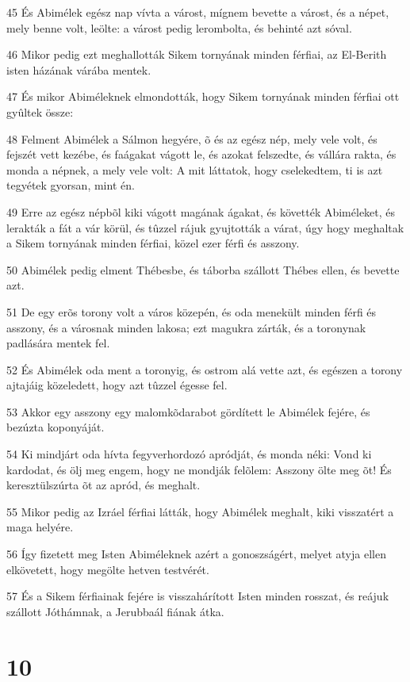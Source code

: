 \par 45 És Abimélek egész nap vívta a várost, mígnem bevette a várost, és a népet, mely benne volt, leölte: a várost pedig lerombolta, és behinté azt sóval.
\par 46 Mikor pedig ezt meghallották Sikem tornyának minden férfiai, az El-Berith isten házának várába mentek.
\par 47 És mikor Abiméleknek elmondották, hogy Sikem tornyának minden férfiai ott gyûltek össze:
\par 48 Felment Abimélek a Sálmon hegyére, õ és az egész nép, mely vele volt, és fejszét vett kezébe, és faágakat vágott le, és azokat felszedte, és vállára rakta, és monda a népnek, a mely vele volt: A mit láttatok, hogy cselekedtem, ti is azt tegyétek gyorsan, mint én.
\par 49 Erre az egész népbõl kiki vágott magának ágakat, és követték Abiméleket, és lerakták a fát a vár körül, és tûzzel rájuk gyujtották a várat, úgy hogy meghaltak a Sikem tornyának minden férfiai, közel ezer férfi és asszony.
\par 50 Abimélek pedig elment Thébesbe, és táborba szállott Thébes ellen, és bevette azt.
\par 51 De egy erõs torony volt a város közepén, és oda menekült minden férfi és asszony, és a városnak minden lakosa; ezt magukra zárták, és a toronynak padlására mentek fel.
\par 52 És Abimélek oda ment a toronyig, és ostrom alá vette azt, és egészen a torony ajtajáig közeledett, hogy azt tûzzel égesse fel.
\par 53 Akkor egy asszony egy malomkõdarabot gördített le Abimélek fejére, és bezúzta koponyáját.
\par 54 Ki mindjárt oda hívta fegyverhordozó apródját, és monda néki: Vond ki kardodat, és ölj meg engem, hogy ne mondják felõlem: Asszony ölte meg õt! És keresztülszúrta õt az apród, és meghalt.
\par 55 Mikor pedig az Izráel férfiai látták, hogy Abimélek meghalt, kiki visszatért a maga helyére.
\par 56 Így fizetett meg Isten Abiméleknek azért a gonoszságért, melyet atyja ellen elkövetett, hogy megölte hetven testvérét.
\par 57 És a Sikem férfiainak fejére is visszahárított Isten minden rosszat, és reájuk szállott Jóthámnak, a Jerubbaál fiának átka.

\chapter{10}

